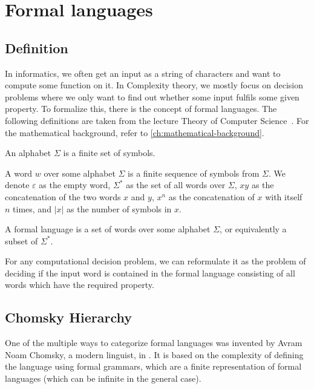 \chapter{Formal languages}\label{ch:formal-languages}


\section{Definition}\label{sec:definition}

In informatics, we often get an input as a string of characters and want to compute some function on it.
In Complexity theory, we mostly focus on decision problems where we only want to find out whether some input fulfils some given property.
To formalize this, there is the concept of formal languages.
The following definitions are taken from the lecture Theory of Computer Science~\cite{theory-cs}.
For the mathematical background, refer to \autoref{ch:mathematical-background}.

\begin{define}[Alphabet]
    An alphabet $\Sigma$ is a finite set of symbols.
\end{define}

\begin{define}[Word]
    A word $w$ over some alphabet $\Sigma$ is a finite sequence of symbols from $\Sigma$.
    We denote $\varepsilon$ as the empty word, $\Sigma^*$ as the set of all words over $\Sigma$, $xy$ as the concatenation of the two words $x$ and $y$, $x^{n}$ as the concatenation of $x$ with itself $n$ times, and $|x|$ as the number of symbols in $x$.
\end{define}

\begin{define}
    A formal language is a set of words over some alphabet $\Sigma$, or equivalently a subset of $\Sigma^*$.
\end{define}

For any computational decision problem, we can reformulate it as the problem of deciding if the input word is contained in the formal language consisting of all words which have the required property.


\section{Chomsky Hierarchy}\label{sec:chromsky-hierarchy}

One of the multiple ways to categorize formal languages was invented by Avram Noam Chomsky, a modern linguist, in \cite{Chomsky1959}.
It is based on the complexity of defining the language using formal grammars, which are a finite representation of formal languages (which can be infinite in the general case).

